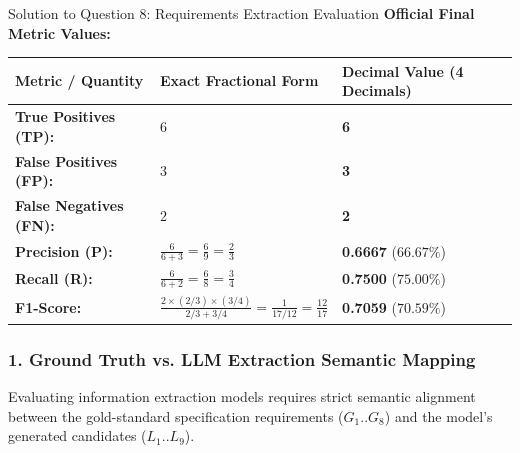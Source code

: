 \documentclass[11pt,a4paper]{article}
\begin{document}
\begin{solutionbox}{Solution to Question 8: Requirements Extraction Evaluation}
\textbf{Official Final Metric Values:}
\begin{center}
\begin{tabularx}{0.88\textwidth}{lXl}
\toprule
\textbf{Metric / Quantity} & \textbf{Exact Fractional Form} & \textbf{Decimal Value (4 Decimals)} \\
\midrule
\textbf{True Positives (TP):} & $6$ & \textbf{6} \\
\textbf{False Positives (FP):} & $3$ & \textbf{3} \\
\textbf{False Negatives (FN):} & $2$ & \textbf{2} \\
\textbf{Precision (P):} & $\frac{6}{6 + 3} = \frac{6}{9} = \frac{2}{3}$ & \textbf{0.6667} ($66.67\%$) \\
\textbf{Recall (R):} & $\frac{6}{6 + 2} = \frac{6}{8} = \frac{3}{4}$ & \textbf{0.7500} ($75.00\%$) \\
\textbf{F1-Score:} & $\frac{2 \times (2/3) \times (3/4)}{2/3 + 3/4} = \frac{1}{17/12} = \frac{12}{17}$ & \textbf{0.7059} ($70.59\%$) \\
\bottomrule
\end{tabularx}
\end{center}

\subsubsection*{1. Ground Truth vs. LLM Extraction Semantic Mapping}
Evaluating information extraction models requires strict semantic alignment between the gold-standard specification requirements ($G_1..G_8$) and the model's generated candidates ($L_1..L_9$).


\end{solutionbox}
\end{document}
